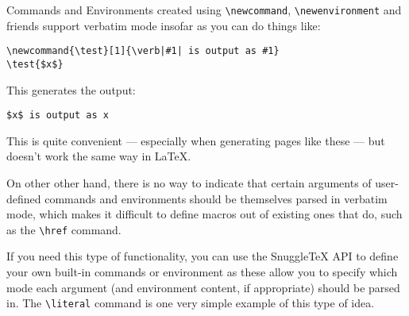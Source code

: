 Commands and Environments created using \verb|\newcommand|,
\verb|\newenvironment| and friends support verbatim mode insofar
as you can do things like:

\begin{verbatim}
\newcommand{\test}[1]{\verb|#1| is output as #1}
\test{$x$}
\end{verbatim}

This generates the output:

\begin{verbatim}
$x$ is output as x
\end{verbatim}

This is quite convenient --- especially when generating pages like these ---
but doesn't work the same way in LaTeX.

On other other hand, there is no way to indicate that certain arguments
of user-defined commands and environments should be themselves parsed in
verbatim mode, which makes it difficult to define macros out of existing
ones that do, such as the \verb|\href| command.

If you need this type of functionality, you can use the SnuggleTeX API to
define your own built-in commands or environment as these allow you to specify
which mode each argument (and environment content, if appropriate) should be
parsed in. The \verb|\literal| command is one very simple example of this
type of idea.
